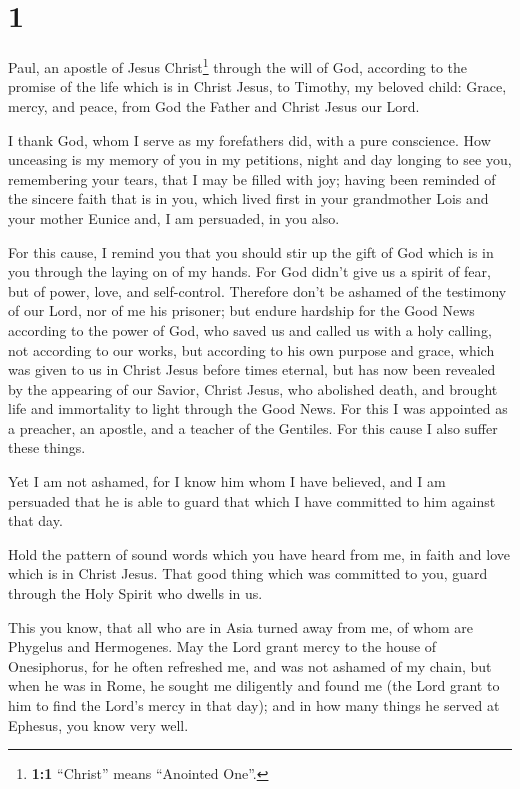 \hypertarget{section}{%
\section{1}\label{section}}

 Paul, an apostle of Jesus Christ\footnote{\textbf{1:1}
  ``Christ'' means ``Anointed One''.} through the will of God, according
to the promise of the life which is in Christ Jesus,  to
Timothy, my beloved child: Grace, mercy, and peace, from God the Father
and Christ Jesus our Lord.

 I thank God, whom I serve as my forefathers did, with a
pure conscience. How unceasing is my memory of you in my petitions,
night and day  longing to see you, remembering your tears,
that I may be filled with joy;  having been reminded of
the sincere faith that is in you, which lived first in your grandmother
Lois and your mother Eunice and, I am persuaded, in you also.

 For this cause, I remind you that you should stir up the
gift of God which is in you through the laying on of my hands.
 For God didn't give us a spirit of fear, but of power,
love, and self-control.  Therefore don't be ashamed of the
testimony of our Lord, nor of me his prisoner; but endure hardship for
the Good News according to the power of God,  who saved us
and called us with a holy calling, not according to our works, but
according to his own purpose and grace, which was given to us in Christ
Jesus before times eternal,  but has now been revealed by
the appearing of our Savior, Christ Jesus, who abolished death, and
brought life and immortality to light through the Good News.
 For this I was appointed as a preacher, an apostle, and
a teacher of the Gentiles.  For this cause I also suffer
these things.

Yet I am not ashamed, for I know him whom I have believed, and I am
persuaded that he is able to guard that which I have committed to him
against that day.

 Hold the pattern of sound words which you have heard
from me, in faith and love which is in Christ Jesus. 
That good thing which was committed to you, guard through the Holy
Spirit who dwells in us.

 This you know, that all who are in Asia turned away from
me, of whom are Phygelus and Hermogenes.  May the Lord
grant mercy to the house of Onesiphorus, for he often refreshed me, and
was not ashamed of my chain,  but when he was in Rome, he
sought me diligently and found me  (the Lord grant to him
to find the Lord's mercy in that day); and in how many things he served
at Ephesus, you know very well.

